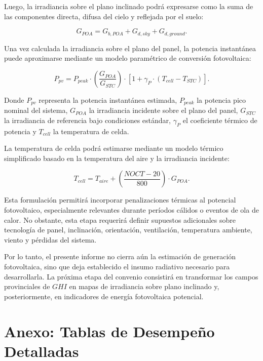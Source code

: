 \documentclass[../main.tex]{subfiles}
\begin{document}
Luego, la irradiancia sobre el plano inclinado podrá expresarse como la suma de las componentes directa, difusa del cielo y reflejada por el suelo:

\begin{equation}
G_{POA}
=
G_{b,POA}
+
G_{d,sky}
+
G_{d,ground}.
\end{equation}

Una vez calculada la irradiancia sobre el plano del panel, la potencia instantánea puede aproximarse mediante un modelo paramétrico de conversión fotovoltaica:

\begin{equation}
P_{pv}
=
P_{peak}
\cdot
\left(
\frac{G_{POA}}{G_{STC}}
\right)
\cdot
\left[
1
+
\gamma_{P}
\cdot
\left(
T_{cell}
-
T_{STC}
\right)
\right].
\end{equation}

Donde $P_{pv}$ representa la potencia instantánea estimada, $P_{peak}$ la potencia pico nominal del sistema, $G_{POA}$ la irradiancia incidente sobre el plano del panel, $G_{STC}$ la irradiancia de referencia bajo condiciones estándar, $\gamma_P$ el coeficiente térmico de potencia y $T_{cell}$ la temperatura de celda.

La temperatura de celda podrá estimarse mediante un modelo térmico simplificado basado en la temperatura del aire y la irradiancia incidente:

\begin{equation}
T_{cell}
=
T_{aire}
+
\left(
\frac{NOCT - 20}{800}
\right)
\cdot
G_{POA}.
\end{equation}

Esta formulación permitirá incorporar penalizaciones térmicas al potencial fotovoltaico, especialmente relevantes durante períodos cálidos o eventos de ola de calor. No obstante, esta etapa requerirá definir supuestos adicionales sobre tecnología de panel, inclinación, orientación, ventilación, temperatura ambiente, viento y pérdidas del sistema.

Por lo tanto, el presente informe no cierra aún la estimación de generación fotovoltaica, sino que deja establecido el insumo radiativo necesario para desarrollarla. La próxima etapa del convenio consistirá en transformar los campos provinciales de $GHI$ en mapas de irradiancia sobre plano inclinado y, posteriormente, en indicadores de energía fotovoltaica potencial.


\newpage
\section*{Anexo: Tablas de Desempeño Detalladas}
\end{document}
